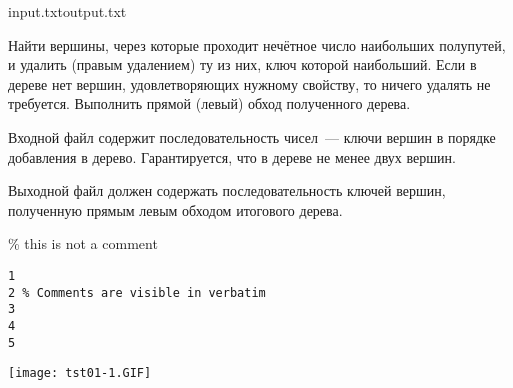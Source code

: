 
\begin{rawproblem}{input.txt}{output.txt}

Найти вершины, через которые проходит нечётное число наибольших полупутей, и
удалить (правым удалением) ту из них, ключ которой наибольший.
Если в дереве нет вершин, удовлетворяющих нужному свойству, то ничего
удалять не требуется. Выполнить прямой (левый) обход полученного дерева.

\InputFile

Входной файл содержит последовательность чисел~--- ключи вершин в порядке добавления в дерево. Гарантируется, что в дереве не менее двух вершин.

\OutputFile

Выходной файл должен содержать последовательность ключей вершин, полученную прямым левым обходом итогового дерева.

\Example

\% this is not a comment

\begin{verbatim}
1
2 % Comments are visible in verbatim
3
4
5
\end{verbatim}

\begin{example}%
%
\end{example}%
\begin{center}%
    \texttt{[image: tst01-1.GIF]}%
\end{center}%

\end{rawproblem}

